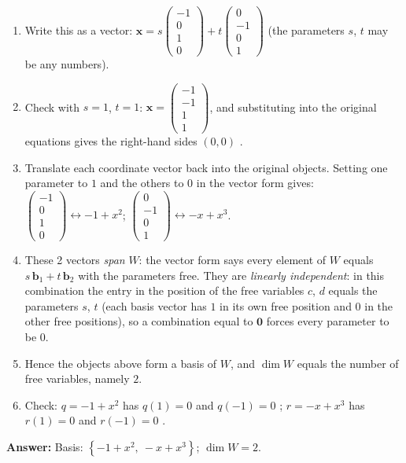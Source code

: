 \documentclass[11pt]{article}
\begin{document}
\begin{tcolorbox}[breakable,colback=white,colframe=ink!60,title={\bfseries Example 3 \textperiodcentered\ Basis of a constraint subspace}]
\begin{enumerate}[leftmargin=1.6em,itemsep=1pt,topsep=2pt,label=\arabic*.]
\item Write this as a vector: $\displaystyle \mathbf x=s\begin{pmatrix}-1\\0\\1\\0\end{pmatrix}+t\begin{pmatrix}0\\-1\\0\\1\end{pmatrix}$ (the parameters $s$, $t$ may be any numbers).
\item Check with $s=1$, $t=1$: $\mathbf x=\begin{pmatrix}-1\\-1\\1\\1\end{pmatrix}$, and substituting into the original equations gives the right-hand sides $(0,0)$ \checkmark.
\item Translate each coordinate vector back into the original objects. Setting one parameter to $1$ and the others to $0$ in the vector form gives: $\begin{pmatrix}-1\\0\\1\\0\end{pmatrix}\leftrightarrow -1+x^{2}$; $\begin{pmatrix}0\\-1\\0\\1\end{pmatrix}\leftrightarrow -x+x^{3}$.
\item These 2 vectors \emph{span} $W$: the vector form says every element of $W$ equals $s\,\mathbf b_1+t\,\mathbf b_2$ with the parameters free. They are \emph{linearly independent}: in this combination the entry in the position of the free variables $c$, $d$ equals the parameters $s$, $t$ (each basis vector has $1$ in its own free position and $0$ in the other free positions), so a combination equal to $\mathbf 0$ forces every parameter to be $0$.
\item Hence the objects above form a basis of $W$, and $\dim W$ equals the number of free variables, namely $2$.
\item Check: $q=-1+x^{2}$ has $q(1)=0$ and $q(-1)=0$ \checkmark; $r=-x+x^{3}$ has $r(1)=0$ and $r(-1)=0$ \checkmark.
\end{enumerate}\textbf{Answer:} Basis: $\left\{-1+x^{2},\ -x+x^{3}\right\}$; $\dim W=2$.
\end{tcolorbox}
\end{document}
